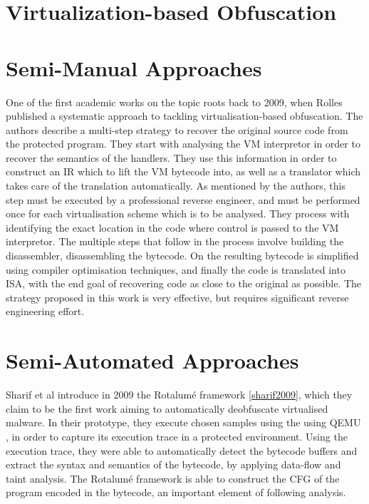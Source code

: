 \section{Virtualization-based Obfuscation}

\section{Semi-Manual Approaches}

One of the first academic works on the topic roots back to 2009, when Rolles \cite{rolles2009unpacking} published a systematic approach to tackling virtualisation-based obfuscation. The authors describe a multi-step strategy to recover the original source code from the protected program. They start with analysing the \gls{VM} interpretor in order to recover the semantics of the handlers. They use this information in order to construct an \gls{IR} which to lift the \gls{VM} bytecode into, as well as a translator which takes care of the translation automatically. As mentioned by the authors, this step must be executed by a professional reverse engineer, and must be performed once for each virtualisation scheme which is to be analysed. They process with identifying the exact location in the code where control is passed to the \gls{VM} interpretor. The multiple steps that follow in the process involve building the disassembler, disassembling the bytecode. On the resulting bytecode is simplified using compiler optimisation techniques, and finally the code is translated into  \gls{ISA}, with the end goal of recovering code as close to the original as possible. The strategy proposed in this work is very effective, but requires significant reverse engineering effort.

\section{Semi-Automated Approaches}

Sharif et al introduce in 2009 the Rotalumé framework \ref{sharif2009}, which they claim to be the first work aiming to automatically deobfuscate virtualised malware. In their prototype, they execute chosen samples using the using QEMU \cite{qemu}, in order to capture its execution trace in a protected environment. Using the execution trace, they were able to automatically detect the bytecode buffers and extract the syntax and semantics of the bytecode, by applying data-flow and taint analysis. The Rotalumé framework is able to construct the \gls{CFG} of the program encoded in the bytecode, an important element of following analysis.

